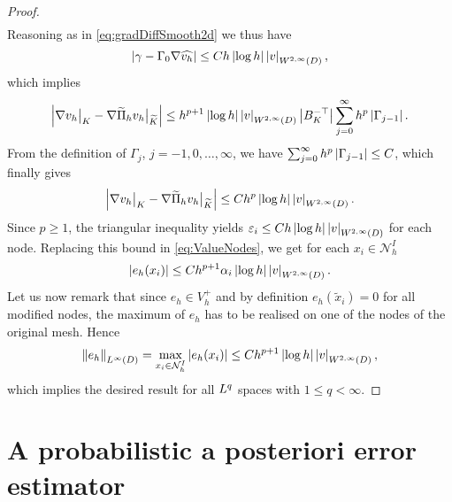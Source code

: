 \documentclass[10pt]{article}
\begin{document}
\begin{proof}
\begin{equation}
\begin{aligned}
	\end{aligned}
	\end{equation}	
	Reasoning as in \eqref{eq:gradDiffSmooth2d} we thus have
	\begin{equation}
		\left\lvert\gamma - \Gamma_0 \nabla \widehat{v_h}\right\rvert \leq Ch \left\lvert\log h\right\rvert\left\lvert v\right\rvert_{W^{2, \infty}(D)},
	\end{equation}
	which implies 
	\begin{equation}
		\left\lvert\nabla v_h\bigr\rvert_{K} - \nabla \widetilde \Pi_h v_h \bigr\rvert_{\widetilde K}\right\rvert \leq h^{p+1}\left\lvert\log h\right\rvert\left\lvert v\right\rvert_{W^{2, \infty}(D)} \left\lvert B_K^{-\top}\right\rvert \sum_{j=0}^{\infty} h^p \left\lvert\Gamma_{j-1}\right\rvert.
	\end{equation}
	From the definition of $\Gamma_j$, $j = -1, 0, \ldots, \infty$, we have $\sum_{j=0}^{\infty} h^p \left\lvert\Gamma_{j-1}\right\rvert \leq C$, which finally gives
	\begin{equation}
		\left\lvert\nabla v_h\bigr\rvert_{K} - \nabla \widetilde \Pi_h v_h \bigr\rvert_{\widetilde K}\right\rvert \leq C h^p \left\lvert\log h\right\rvert \left\lvert v\right\rvert_{W^{2, \infty}(D)}.
	\end{equation}
	Since $p \geq 1$, the triangular inequality yields $\varepsilon_{i} \leq Ch \left\lvert\log h\right\rvert \left\lvert v\right\rvert_{W^{2, \infty}(D)}$ for each node. Replacing this bound in \eqref{eq:ValueNodes}, we get for each $x_i \in \mathcal N_h^I$
	\begin{equation}
		\left\lvert e_h(x_i)\right\rvert \leq C h^{p+1} \alpha_i \left\lvert\log h\right\rvert \left\lvert v\right\rvert_{W^{2, \infty}(D)}.
	\end{equation}
	Let us now remark that since $e_h \in V_h^+$ and by definition $e_h(\tilde x_i) = 0$ for all modified nodes, the maximum of $e_h$ has to be realised on one of the nodes of the original mesh. Hence
	\begin{equation}
		\left\|e_h\right\|_{L^{\infty}(D)} = \max_{x_i \in \mathcal N_h^{I}} \left\lvert e_h(x_i)\right\rvert \leq C h^{p+1} \left\lvert\log h\right\rvert \left\lvert v\right\rvert_{W^{2, \infty}(D)},
	\end{equation}
	which implies the desired result for all $L^q$ spaces with $1 \leq q < \infty$.
\end{proof}

\section{A probabilistic a posteriori error estimator}\label{sec:errorestimation}
 
\end{document}
